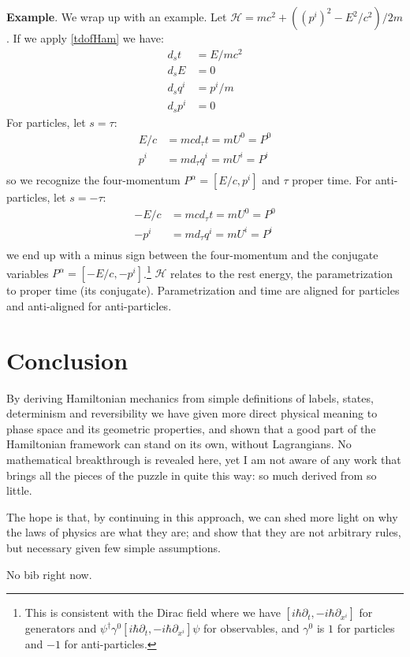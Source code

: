 \documentclass[twocolumn,floatfix,nofootinbib]{revtex4}   %
\theoremstyle{theorem}
\theoremstyle{definition}
\begin{document}
\textbf{Example}. We wrap up with an example. Let $\mathcal{H} = mc^2 + ((p^i)^2 - E^2/c^2) / 2m$.  If we apply \ref{tdofHam} we have:
\begin{align*}
d_{s}t &= E / mc^2 \\
d_{s}E &= 0 \\
d_{s}q^i &= p^i / m \\
d_{s}p^i &= 0
\end{align*}
For particles, let $s=\tau$:
\begin{align*}
E / c &= m c d_{\tau}t = m U^0 = P^0 \\
p^i &= m d_{\tau}q^i = m U^i = P^i \\
\end{align*}
so we recognize the four-momentum $P^\alpha = [E/c, p^i]$ and $\tau$ proper time. For anti-particles, let $s=-\tau$:
\begin{align*}
- E / c &= m c d_{\tau}t = m U^0 = P^0 \\
- p^i &= m d_{\tau}q^i = m U^i = P^i \\
\end{align*}
we end up with a minus sign between the four-momentum and the conjugate variables $P^\alpha = [-E/c, -p^i]$.\footnote{This is consistent with the Dirac field where we have $[i\hbar\partial_t, -i\hbar\partial_{x^i}]$ for generators and $\psi^\dagger\gamma^0[i\hbar\partial_t, -i\hbar\partial_{x^i}]\psi$ for observables, and $\gamma^0$ is $1$ for particles and $-1$ for anti-particles.} $\mathcal{H}$ relates to the rest energy, the parametrization to proper time (its conjugate). Parametrization and time are aligned for particles and anti-aligned for anti-particles.

\section{Conclusion}
By deriving Hamiltonian mechanics from simple definitions of labels, states, determinism and reversibility we have given more direct physical meaning to phase space and its geometric properties, and shown that a good part of the Hamiltonian framework can stand on its own, without Lagrangians. No mathematical breakthrough is revealed here, yet I am not aware of any work that brings all the pieces of the puzzle in quite this way: so much derived from so little.

The hope is that, by continuing in this approach, we can shed more light on why the laws of physics are what they are; and show that they are not arbitrary rules, but necessary given few simple assumptions.

\begin{thebibliography}{5}

 No bib right now.

\end{thebibliography}
\end{document}
